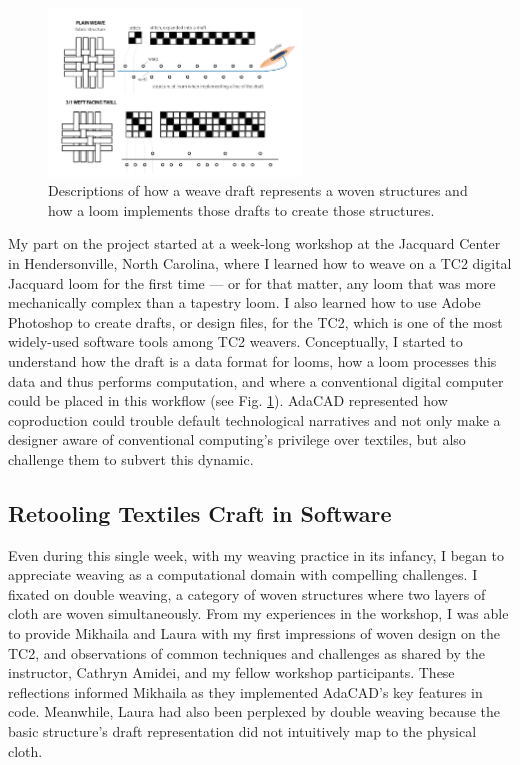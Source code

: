 \begin{figure}
  \centering
  \includegraphics[width=0.6\textwidth]{figs/AdaCAD_weavedrafts_300.jpg}
  \caption[Examples of weaving draft notation.]{Descriptions of how a weave draft represents a woven structures and how a loom implements those drafts to create those structures.
  }
  \label{fig:adacad-drafts}
\end{figure}

My part on the project started at a week-long workshop at the Jacquard Center in Hendersonville, North Carolina, where I learned how to weave on a TC2 digital Jacquard loom for the first time --- or for that matter, any loom that was more mechanically complex than a tapestry loom. I also learned how to use Adobe Photoshop to create drafts, or design files, for the TC2, which is one of the most widely-used software tools among TC2 weavers. Conceptually, I started to understand how the draft is a data format for looms, how a loom processes this data and thus performs computation, and where a conventional digital computer could be placed in this workflow (see Fig. \ref{fig:adacad-drafts}). AdaCAD represented how coproduction could trouble default technological narratives and not only make a designer aware of conventional computing's privilege over textiles, but also challenge them to subvert this dynamic.

\subsection{Retooling Textiles Craft in Software}

Even during this single week, with my weaving practice in its infancy, I began to appreciate weaving as a computational domain with compelling challenges. I fixated on double weaving, a category of woven structures where two layers of cloth are woven simultaneously. From my experiences in the workshop, I was able to provide Mikhaila and Laura with my first impressions of woven design on the TC2, and observations of common techniques and challenges as shared by the instructor, Cathryn Amidei, and my fellow workshop participants. These reflections informed Mikhaila as they implemented AdaCAD's key features in code. Meanwhile, Laura had also been perplexed by double weaving because the basic structure's draft representation did not intuitively map to the physical cloth.


